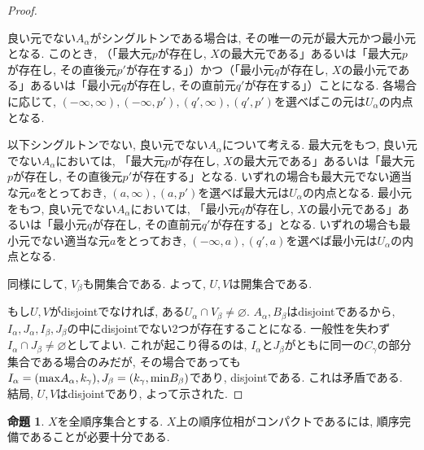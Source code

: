 \documentclass[a4paper, twoside]{bxjsarticle}
\theoremstyle{definition}
\newtheorem{prop}[thm]{命題}
\begin{document}
\begin{proof}
\begin{framed}
                良い元でない$A_\alpha$がシングルトンである場合は, その唯一の元が最大元かつ最小元となる. このとき, （「最大元$p$が存在し, $X$の最大元である」あるいは「最大元$p$が存在し, その直後元$p'$が存在する」）かつ（「最小元$q$が存在し, $X$の最小元である」あるいは「最小元$q$が存在し, その直前元$q'$が存在する」）ことになる. 各場合に応じて, $(-\infty, \infty), (-\infty, p'), (q', \infty), (q', p')$を選べばこの元は$U_\alpha$の内点となる.
                
                以下シングルトンでない, 良い元でない$A_\alpha$について考える.
                最大元をもつ, 良い元でない$A_\alpha$においては, 「最大元$p$が存在し, $X$の最大元である」あるいは「最大元$p$が存在し, その直後元$p'$が存在する」となる. いずれの場合も最大元でない適当な元$a$をとっておき, $(a, \infty), (a, p')$を選べば最大元は$U_\alpha$の内点となる.
                 最小元をもつ, 良い元でない$A_\alpha$においては, 「最小元$q$が存在し, $X$の最小元である」あるいは「最小元$q$が存在し, その直前元$q'$が存在する」となる. いずれの場合も最小元でない適当な元$a$をとっておき, $(-\infty, a), (q',  a)$を選べば最小元は$U_\alpha$の内点となる.
            \end{framed}
            同様にして, $V_\beta$も開集合である. よって, $U, V$は開集合である.
            
            もし$U, V$がdisjointでなければ, ある$U_\alpha\cap V_\beta\neq\varnothing$. $A_\alpha, B_\beta$はdisjointであるから, $I_\alpha, J_\alpha, I_\beta, J_\beta$の中にdisjointでない2つが存在することになる. 一般性を失わず$I_\alpha\cap J_\beta\neq\varnothing$としてよい. これが起こり得るのは, $I_\alpha$と$J_\beta$がともに同一の$C_\gamma$の部分集合である場合のみだが, その場合であっても$I_\alpha=({\rm max}A_\alpha, k_\gamma), J_\beta=(k_\gamma, {\rm min}B_\beta)$であり, disjointである. これは矛盾である. 結局, $U, V$はdisjointであり, よって示された.
        \end{proof}
        \begin{prop}
            $X$を全順序集合とする. $X$上の順序位相がコンパクトであるには, 順序完備であることが必要十分である.
        \end{prop}
\end{document}
